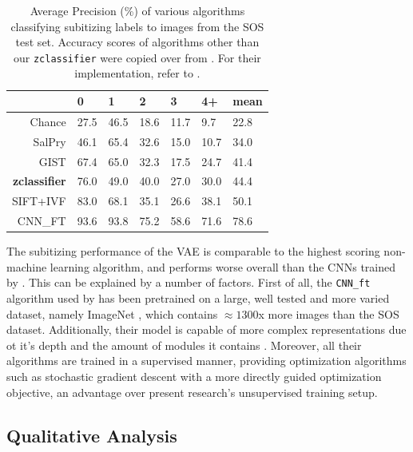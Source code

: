 \documentclass[twocolumn]{article}
\begin{document}
\begin{longtable}[]{@{}rllllll@{}}
\caption{Average Precision (\%) of various algorithms classifying subitizing labels to images from the SOS test set. Accuracy scores of algorithms other than our \texttt{zclassifier} were copied over from \citet{zhang2016salient}. For their
implementation, refer to \citet{zhang2016salient}. }\label{tab:sub-performance}\\
\toprule
& 0 & 1 & 2 & 3 & 4+ & mean\tabularnewline
\midrule
\endhead
Chance & 27.5 & 46.5 & 18.6 & 11.7 & 9.7 & 22.8\tabularnewline
SalPry & 46.1 & 65.4 & 32.6 & 15.0 & 10.7 & 34.0\tabularnewline
GIST & 67.4 & 65.0 & 32.3 & 17.5 & 24.7 & 41.4\tabularnewline
\textbf{zclassifier} & 76.0 & 49.0 & 40.0 & 27.0 & 30.0 & 44.4\tabularnewline
SIFT+IVF & 83.0 & 68.1 & 35.1 & 26.6 & 38.1 & 50.1\tabularnewline
CNN\_FT & 93.6 & 93.8 & 75.2 & 58.6 & 71.6 & 78.6\tabularnewline
\bottomrule
\end{longtable}
The subitizing performance of the VAE is comparable to the highest scoring
non-machine learning algorithm, and performs worse overall than the CNNs
trained by \citet{zhang2016salient}. This can be explained by a number
of factors. First of all, the \texttt{CNN\_ft} algorithm used by
\citet{zhang2016salient} has been pretrained on a large, well tested and
more varied dataset, namely ImageNet \citep{russakovsky2015imagenet},
which contains \(\approx 1300\)x more images than the SOS dataset. Additionally, their model
is capable of more complex representations due ot it's depth and the amount
of modules it contains \citep[the applied model from][ uses 22 modules compared
to the 12 in our approach]{szegedy2015going}. Moreover, all their
algorithms are trained in a supervised manner, providing optimization
algorithms such as stochastic gradient descent with a more directly
guided optimization objective, an advantage over present research's
unsupervised training setup.

\hypertarget{qualitative-analysis}{%
\subsection{Qualitative Analysis}\label{qualitative-analysis}}
\end{document}
